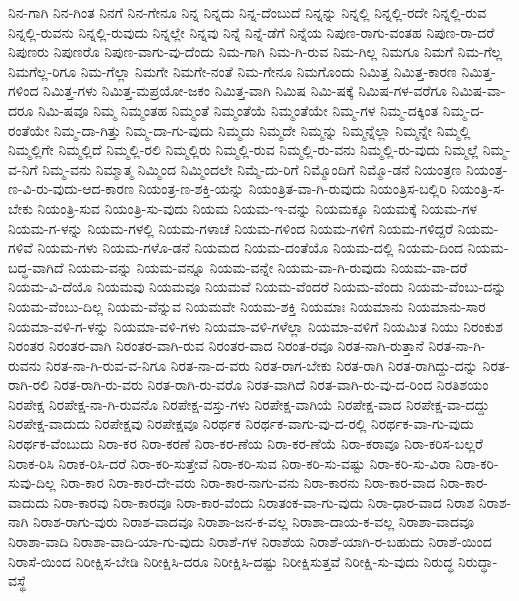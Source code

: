 {ನಿನ-ಗಾಗಿ
ನಿನ-ಗಿಂತ
ನಿನಗೆ
ನಿನ-ಗೇನೂ
ನಿನ್ನ
ನಿನ್ನದು
ನಿನ್ನ-ದೆಂಬುದೆ
ನಿನ್ನನ್ನು
ನಿನ್ನಲ್ಲಿ
ನಿನ್ನಲ್ಲಿ-ರದೇ
ನಿನ್ನಲ್ಲಿ-ರುವ
ನಿನ್ನಲ್ಲಿ-ರುವನು
ನಿನ್ನಲ್ಲಿ-ರುವುದು
ನಿನ್ನಲ್ಲೇ
ನಿನ್ನವು
ನಿನ್ನೆ
ನಿನ್ನೆ-ಡೆಗೆ
ನಿನ್ನೆಯ
ನಿಪುಣ-ರಾಗು-ವಂತಹ
ನಿಪುಣ-ರಾ-ದರೆ
ನಿಪುಣರು
ನಿಪುಣರೊ
ನಿಪುಣ-ವಾಗು-ವು-ದೆಂದು
ನಿಮ-ಗಾಗಿ
ನಿಮ-ಗಿ-ರುವ
ನಿಮ-ಗಿಲ್ಲ
ನಿಮಗೂ
ನಿಮಗೆ
ನಿಮ-ಗೆಲ್ಲ
ನಿಮಗೆಲ್ಲ-ರಿಗೂ
ನಿಮ-ಗೆಲ್ಲಾ
ನಿಮಗೇ
ನಿಮಗೇ-ನಂತೆ
ನಿಮ-ಗೇನೂ
ನಿಮಗೊಂದು
ನಿಮಿತ್ತ
ನಿಮಿತ್ತ-ಕಾರಣ
ನಿಮಿತ್ತ-ಗಳಿಂದ
ನಿಮಿತ್ತ-ಗಳು
ನಿಮಿತ್ತ-ಮಪ್ರಯೋ-ಜಕಂ
ನಿಮಿತ್ತ-ವಾಗಿ
ನಿಮಿಷ
ನಿಮಿ-ಷಕ್ಕೆ
ನಿಮಿಷ-ಗಳ-ವರೆಗೂ
ನಿಮಿಷ-ವಾ-ದರೂ
ನಿಮಿ-ಷವೂ
ನಿಮ್ಮ
ನಿಮ್ಮಂತಹ
ನಿಮ್ಮಂತೆ
ನಿಮ್ಮಂತೆಯೆ
ನಿಮ್ಮಂತೆಯೇ
ನಿಮ್ಮ-ಗಳ
ನಿಮ್ಮ-ದಕ್ಕಿಂತ
ನಿಮ್ಮ-ದ-ರಂತೆಯೇ
ನಿಮ್ಮ-ದಾ-ಗಿತ್ತು
ನಿಮ್ಮ-ದಾ-ಗು-ವುದು
ನಿಮ್ಮದು
ನಿಮ್ಮದೇ
ನಿಮ್ಮನ್ನು
ನಿಮ್ಮನ್ನೆಲ್ಲಾ
ನಿಮ್ಮನ್ನೇ
ನಿಮ್ಮಲ್ಲಿ
ನಿಮ್ಮಲ್ಲಿಗೇ
ನಿಮ್ಮಲ್ಲಿದೆ
ನಿಮ್ಮಲ್ಲಿ-ರಲಿ
ನಿಮ್ಮಲ್ಲಿರು
ನಿಮ್ಮಲ್ಲಿ-ರುವ
ನಿಮ್ಮಲ್ಲಿ-ರು-ವನು
ನಿಮ್ಮಲ್ಲಿ-ರು-ವುದು
ನಿಮ್ಮಲ್ಲೆ
ನಿಮ್ಮ-ವ-ನಿಗೆ
ನಿಮ್ಮ-ವನು
ನಿಮ್ಮಾತ್ಮ
ನಿಮ್ಮಿಂದ
ನಿಮ್ಮಿಂದಲೇ
ನಿಮ್ಮೆ-ದು-ರಿಗೆ
ನಿಮ್ಮೊಂದಿಗೆ
ನಿಮ್ಮೊ-ಡನೆ
ನಿಯಂತ್ರಣ
ನಿಯಂತ್ರ-ಣ-ವಿ-ರು-ವುದು-ಆದ-ಕಾರಣ
ನಿಯಂತ್ರ-ಣ-ಶಕ್ತಿ-ಯನ್ನು
ನಿಯಂತ್ರಿತ-ವಾ-ಗಿ-ರುವುದು
ನಿಯಂತ್ರಿಸ-ಬಲ್ಲಿರಿ
ನಿಯಂತ್ರಿ-ಸ-ಬೇಕು
ನಿಯಂತ್ರಿ-ಸುವ
ನಿಯಂತ್ರಿ-ಸು-ವುದು
ನಿಯಮ
ನಿಯಮ-ಇ-ವನ್ನು
ನಿಯಮಕ್ಕೂ
ನಿಯಮಕ್ಕೆ
ನಿಯಮ-ಗಳ
ನಿಯಮ-ಗ-ಳನ್ನು
ನಿಯಮ-ಗಳಲ್ಲಿ
ನಿಯಮ-ಗಳಾಚೆ
ನಿಯಮ-ಗಳಿಂದ
ನಿಯಮ-ಗಳಿಗೆ
ನಿಯಮ-ಗಳಿದ್ದರೆ
ನಿಯಮ-ಗಳಿವೆ
ನಿಯಮ-ಗಳು
ನಿಯಮ-ಗಳೊ-ಡನೆ
ನಿಯಮದ
ನಿಯಮ-ದಂತೆಯೊ
ನಿಯಮ-ದಲ್ಲಿ
ನಿಯಮ-ದಿಂದ
ನಿಯಮ-ಬದ್ಧ-ವಾಗಿದೆ
ನಿಯಮ-ವನ್ನು
ನಿಯಮ-ವನ್ನೂ
ನಿಯಮ-ವನ್ನೇ
ನಿಯಮ-ವಾ-ಗಿ-ರುವುದು
ನಿಯಮ-ವಾ-ದರೆ
ನಿಯಮ-ವಿ-ದೆಯೊ
ನಿಯಮವು
ನಿಯಮವೂ
ನಿಯಮವೆ
ನಿಯಮ-ವೆಂದರೆ
ನಿಯಮ-ವೆಂದು
ನಿಯಮ-ವೆಂಬು-ದನ್ನು
ನಿಯಮ-ವೆಂಬು-ದಿಲ್ಲ
ನಿಯಮ-ವೆನ್ನುವ
ನಿಯಮವೇ
ನಿಯಮ-ಶಕ್ತಿ
ನಿಯಮಾಃ
ನಿಯಮಾನು
ನಿಯಮಾನು-ಸಾರ
ನಿಯಮಾ-ವಳಿ-ಗ-ಳನ್ನು
ನಿಯಮಾ-ವಳಿ-ಗಳು
ನಿಯಮಾ-ವಳಿ-ಗಳೆಲ್ಲಾ
ನಿಯಮಾ-ವಳಿಗೆ
ನಿಯಮಿತ
ನಿಯು
ನಿರಂಕುಶ
ನಿರಂತರ
ನಿರಂತರ-ವಾಗಿ
ನಿರಂತರ-ವಾಗಿ-ರುವ
ನಿರಂತರ-ವಾದ
ನಿರಂತ-ರವೂ
ನಿರತ-ನಾಗಿ-ರುತ್ತಾನೆ
ನಿರತ-ನಾ-ಗಿ-ರುವನು
ನಿರತ-ನಾ-ಗಿ-ರುವ-ವ-ನಿಗೂ
ನಿರತ-ನಾ-ದ-ವರು
ನಿರತ-ರಾಗ-ಬೇಕು
ನಿರತ-ರಾಗಿ
ನಿರತ-ರಾಗಿದ್ದು-ದನ್ನು
ನಿರತ-ರಾಗಿ-ರಲಿ
ನಿರತ-ರಾಗಿ-ರು-ವರು
ನಿರತ-ರಾಗಿ-ರು-ವರೊ
ನಿರತ-ವಾಗಿದೆ
ನಿರತ-ವಾಗಿ-ರು-ವು-ದ-ರಿಂದ
ನಿರತಿಶಯಂ
ನಿರಪೇಕ್ಷ
ನಿರಪೇಕ್ಷ-ನಾ-ಗಿ-ರುವನೊ
ನಿರಪೇಕ್ಷ-ವಸ್ತು-ಗಳು
ನಿರಪೇಕ್ಷ-ವಾಗಿಯೆ
ನಿರಪೇಕ್ಷ-ವಾದ
ನಿರಪೇಕ್ಷ-ವಾ-ದದ್ದು
ನಿರಪೇಕ್ಷ-ವಾದುದು
ನಿರಪೇಕ್ಷವು
ನಿರಪೇಕ್ಷವೂ
ನಿರರ್ಥಕ
ನಿರರ್ಥಕ-ವಾಗು-ವು-ದ-ರಲ್ಲಿ
ನಿರರ್ಥಕ-ವಾ-ಗು-ವುದು
ನಿರರ್ಥಕ-ವೆಂಬುದು
ನಿರಾ-ಕರ
ನಿರಾ-ಕರಣೆ
ನಿರಾ-ಕರ-ಣೆಯ
ನಿರಾ-ಕರ-ಣೆಯೆ
ನಿರಾ-ಕರಾವೂ
ನಿರಾ-ಕರಿಸ-ಬಲ್ಲರೆ
ನಿರಾಕ-ರಿಸಿ
ನಿರಾಕ-ರಿಸಿ-ದರೆ
ನಿರಾ-ಕರಿ-ಸುತ್ತೇವೆ
ನಿರಾ-ಕರಿ-ಸುವ
ನಿರಾ-ಕರಿ-ಸು-ವಷ್ಟು
ನಿರಾ-ಕರಿ-ಸು-ವಿರಾ
ನಿರಾ-ಕರಿ-ಸುವು-ದಿಲ್ಲ
ನಿರಾ-ಕಾರ
ನಿರಾ-ಕಾರ-ದೇ-ವರು
ನಿರಾ-ಕಾರ-ನಾಗು-ವನು
ನಿರಾ-ಕಾರನು
ನಿರಾ-ಕಾರ-ವಾದ
ನಿರಾ-ಕಾರ-ವಾದುದು
ನಿರಾ-ಕಾರವು
ನಿರಾ-ಕಾರವೂ
ನಿರಾ-ಕಾರ-ವೆಂದು
ನಿರಾತಂಕ-ವಾ-ಗು-ವುದು
ನಿರಾ-ಧಾರ-ವಾದ
ನಿರಾಶ
ನಿರಾಶ-ನಾಗಿ
ನಿರಾಶ-ರಾಗು-ವುರು
ನಿರಾಶ-ವಾದವೂ
ನಿರಾಶಾ-ಜನ-ಕ-ವಲ್ಲ
ನಿರಾಶಾ-ದಾಯ-ಕ-ವಲ್ಲ
ನಿರಾಶಾ-ವಾದವೂ
ನಿರಾಶಾ-ವಾದಿ
ನಿರಾಶಾ-ವಾದಿ-ಯಾ-ಗು-ವುದು
ನಿರಾಶೆ-ಗಳ
ನಿರಾಶೆಯ
ನಿರಾಶೆ-ಯಾಗಿ-ರ-ಬಹುದು
ನಿರಾಶೆ-ಯಿಂದ
ನಿರಾಸೆ-ಯಿಂದ
ನಿರೀಕ್ಷಿಸ-ಬೇಡಿ
ನಿರೀಕ್ಷಿಸಿ-ದರೂ
ನಿರೀಕ್ಷಿಸಿ-ದಷ್ಟು
ನಿರೀಕ್ಷಿಸುತ್ತವೆ
ನಿರೀಕ್ಷಿ-ಸು-ವುದು
ನಿರುದ್ಧ
ನಿರುದ್ಧಾ-ವಸ್ಥೆ
}

